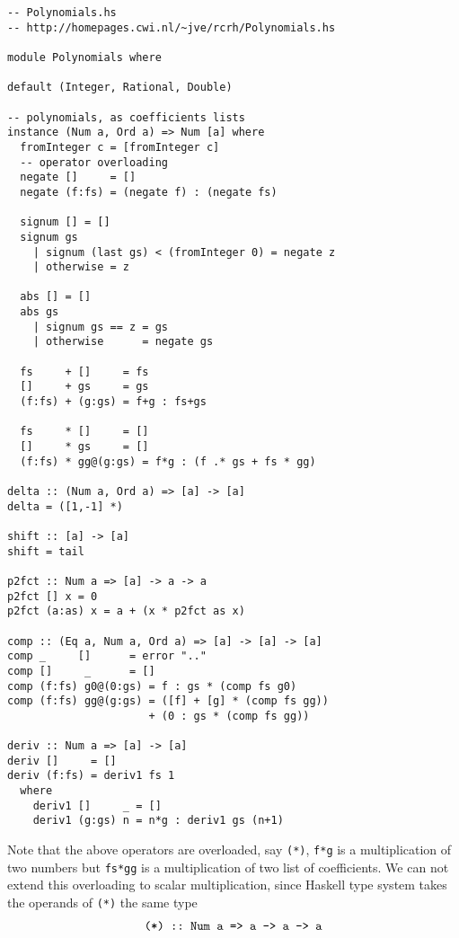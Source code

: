 \documentclass[11pt]{book}
\begin{document}
\begin{verbatim}
-- Polynomials.hs
-- http://homepages.cwi.nl/~jve/rcrh/Polynomials.hs

module Polynomials where

default (Integer, Rational, Double) 

-- polynomials, as coefficients lists
instance (Num a, Ord a) => Num [a] where
  fromInteger c = [fromInteger c] 
  -- operator overloading
  negate []     = []
  negate (f:fs) = (negate f) : (negate fs)

  signum [] = []
  signum gs 
    | signum (last gs) < (fromInteger 0) = negate z
    | otherwise = z

  abs [] = []
  abs gs 
    | signum gs == z = gs
    | otherwise      = negate gs

  fs     + []     = fs
  []     + gs     = gs
  (f:fs) + (g:gs) = f+g : fs+gs

  fs     * []     = []
  []     * gs     = []
  (f:fs) * gg@(g:gs) = f*g : (f .* gs + fs * gg)

delta :: (Num a, Ord a) => [a] -> [a]
delta = ([1,-1] *)

shift :: [a] -> [a]
shift = tail 

p2fct :: Num a => [a] -> a -> a
p2fct [] x = 0
p2fct (a:as) x = a + (x * p2fct as x)

comp :: (Eq a, Num a, Ord a) => [a] -> [a] -> [a]
comp _     []      = error ".."
comp []     _      = []
comp (f:fs) g0@(0:gs) = f : gs * (comp fs g0)
comp (f:fs) gg@(g:gs) = ([f] + [g] * (comp fs gg))
                      + (0 : gs * (comp fs gg))

deriv :: Num a => [a] -> [a]
deriv []     = []
deriv (f:fs) = deriv1 fs 1 
  where 
    deriv1 []     _ = []
    deriv1 (g:gs) n = n*g : deriv1 gs (n+1)

\end{verbatim}
Note that the above operators are overloaded, say \texttt{(*)}, \texttt{f*g} is a multiplication of two numbers but \texttt{fs*gg} is a multiplication of two list of coefficients.
We can not extend this overloading to scalar multiplication, since Haskell type system takes the operands of \texttt{(*)} the same type
\begin{eqnarray}
\verb+(*) :: Num a => a -> a -> a+
\end{eqnarray}
\end{document}
